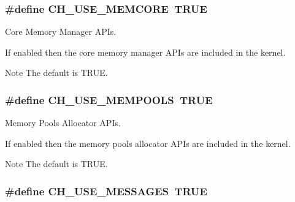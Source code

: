 \subsubsection[{C\+H\+\_\+\+U\+S\+E\+\_\+\+M\+E\+M\+C\+O\+R\+E}]{\setlength{\rightskip}{0pt plus 5cm}\#define C\+H\+\_\+\+U\+S\+E\+\_\+\+M\+E\+M\+C\+O\+R\+E~T\+R\+U\+E}\label{group__config_gaff85f4d919dac30a337ce2f34e2fa1af}


Core Memory Manager A\+P\+Is. 

If enabled then the core memory manager A\+P\+Is are included in the kernel.

\begin{DoxyNote}{Note}
The default is {\ttfamily T\+R\+U\+E}. 
\end{DoxyNote}
\hypertarget{group__config_gac456517b37f104d2226fef50310c79f8}{}
\subsubsection[{C\+H\+\_\+\+U\+S\+E\+\_\+\+M\+E\+M\+P\+O\+O\+L\+S}]{\setlength{\rightskip}{0pt plus 5cm}\#define C\+H\+\_\+\+U\+S\+E\+\_\+\+M\+E\+M\+P\+O\+O\+L\+S~T\+R\+U\+E}\label{group__config_gac456517b37f104d2226fef50310c79f8}


Memory Pools Allocator A\+P\+Is. 

If enabled then the memory pools allocator A\+P\+Is are included in the kernel.

\begin{DoxyNote}{Note}
The default is {\ttfamily T\+R\+U\+E}. 
\end{DoxyNote}
\hypertarget{group__config_ga3823e336736d522bbfaf780c86746482}{}
\subsubsection[{C\+H\+\_\+\+U\+S\+E\+\_\+\+M\+E\+S\+S\+A\+G\+E\+S}]{\setlength{\rightskip}{0pt plus 5cm}\#define C\+H\+\_\+\+U\+S\+E\+\_\+\+M\+E\+S\+S\+A\+G\+E\+S~T\+R\+U\+E}\label{group__config_ga3823e336736d522bbfaf780c86746482}


